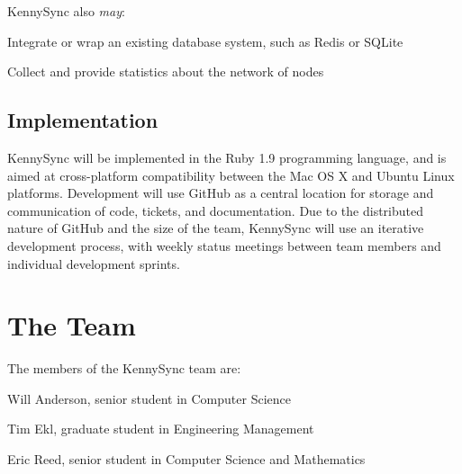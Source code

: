 \documentclass{article}
\begin{document}
KennySync also \textit{may}:

\begin{itemize*}
\item Integrate or wrap an existing database system, such as Redis or SQLite
\item Collect and provide statistics about the network of nodes
\end{itemize*}

\subsection{Implementation}

KennySync will be implemented in the Ruby 1.9 programming language, and is aimed at cross-platform compatibility between the Mac OS X and Ubuntu Linux platforms. Development will use GitHub as a central location for storage and communication of code, tickets, and documentation. Due to the distributed nature of GitHub and the size of the team, KennySync will use an iterative development process, with weekly status meetings between team members and individual development sprints.

\section{The Team}

The members of the KennySync team are:

\begin{itemize*}
\item Will Anderson, senior student in Computer Science
\item Tim Ekl, graduate student in Engineering Management
\item Eric Reed, senior student in Computer Science and Mathematics
\end{itemize*}
\end{document}
